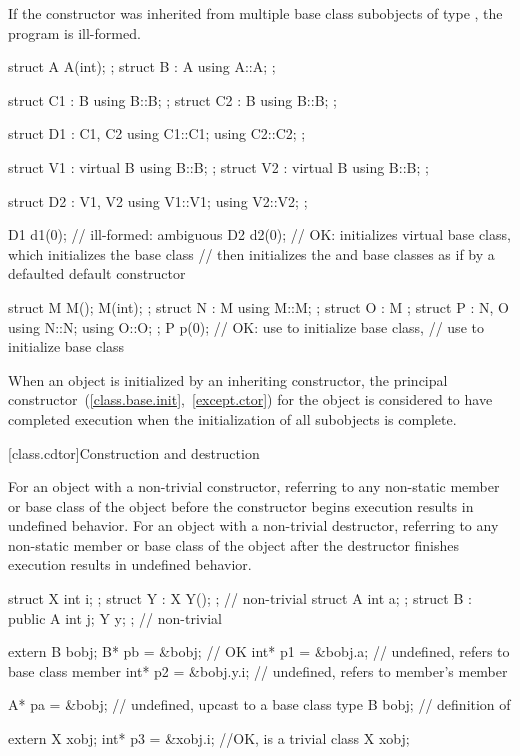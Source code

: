 \pnum
If the constructor was inherited from multiple base class subobjects
of type , the program is ill-formed.
\enterexample
\begin{codeblock}
struct A { A(int); };
struct B : A { using A::A; };

struct C1 : B { using B::B; };
struct C2 : B { using B::B; };

struct D1 : C1, C2 {
  using C1::C1;
  using C2::C2;
};

struct V1 : virtual B { using B::B; };
struct V2 : virtual B { using B::B; };

struct D2 : V1, V2 {
  using V1::V1;
  using V2::V2;
};

D1 d1(0); // ill-formed: ambiguous
D2 d2(0); // OK: initializes virtual  base class, which initializes the  base class
          // then initializes the  and  base classes as if by a defaulted default constructor

struct M { M(); M(int); };
struct N : M { using M::M; };
struct O : M {};
struct P : N, O { using N::N; using O::O; };
P p(0); // OK: use  to initialize  base class,
        // use  to initialize  base class
\end{codeblock}
\exitexample

\pnum
When an object is initialized by an inheriting constructor,
the principal constructor~(\ref{class.base.init},~\ref{except.ctor})
for the object is considered to have completed execution
when the initialization of all subobjects is complete.

[class.cdtor]{Construction and destruction}%
%

\pnum
{}%
%
For an object with a non-trivial constructor, referring to any non-static member
or base class of the object before the constructor begins execution results in
undefined behavior. For an object with a non-trivial destructor, referring to
any non-static member or base class of the object after the destructor finishes
execution results in undefined behavior.
\enterexample

\begin{codeblock}
struct X { int i; };
struct Y : X { Y(); };                  // non-trivial
struct A { int a; };
struct B : public A { int j; Y y; };    // non-trivial

extern B bobj;
B* pb = &bobj;                          // OK
int* p1 = &bobj.a;                      // undefined, refers to base class member
int* p2 = &bobj.y.i;                    // undefined, refers to member's member

A* pa = &bobj;                          // undefined, upcast to a base class type
B bobj;                                 // definition of 

extern X xobj;
int* p3 = &xobj.i;                      //OK,  is a trivial class
X xobj;
\end{codeblock}

